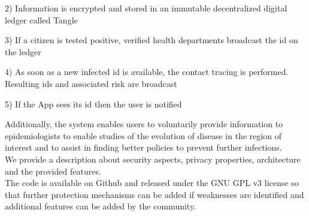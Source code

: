 2) Information is encrypted and stored in an immutable decentralized digital ledger called Tangle

3) If a citizen is tested positive, verified health departments broadcast the id on the ledger

4) As soon as a new infected id is available, the contact tracing is performed. Resulting ids and associated risk are broadcast

5) If the App sees its id then the user is notified


Additionally, the system enables users to voluntarily provide information to epidemiologists to enable studies of the evolution of disease in the region of interest and to assist in finding better policies to prevent further infections.
\\
We provide a description about security aspects, privacy properties, architecture and the provided features. 
\\
The code is available on Github and released under the GNU GPL v3 license so that further protection mechanisms can be added if weaknesses are identified and additional features can be added by the community.


